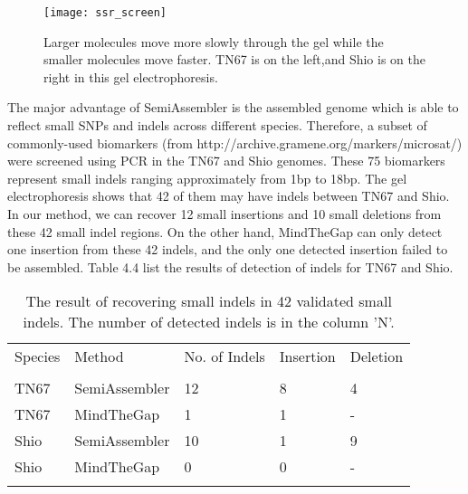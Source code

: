 \begin{figure}[ht]
\begin{center}
\texttt{[image: ssr\_screen]}
\caption{Larger molecules move more slowly through the gel while the smaller molecules move faster. TN67 is on the left,and Shio is on the right in this gel electrophoresis.}
\label{}
\end{center}
\end{figure}

The major advantage of SemiAssembler is the assembled genome which is able to reflect small SNPs and indels across different species. Therefore, a subset of commonly-used biomarkers (from http://archive.gramen\-e.org/markers/microsat/) were screened using PCR in the TN67 and Shio genomes. 
These 75 biomarkers represent small indels ranging approximately from 1bp to 18bp. The gel electrophoresis shows that 42 of them may have indels between TN67 and Shio. In our method, we can recover 12 small insertions and 10 small deletions from these 42 small indel regions. On the other hand, MindTheGap can only detect one insertion from these 42 indels, and the only one detected insertion failed to be assembled. Table 4.4 list the results of detection of indels for TN67 and Shio.

\hfill
\begin{table}[!ht]
    \centering
    \begin{tabular}[t]{l|llll}
     Species & Method &  No. of Indels & Insertion & Deletion\\\\
      \hline
      
    TN67 & SemiAssembler & 12 & 8 & 4 \\
    TN67 & MindTheGap & 1 & 1 & - \\
    Shio & SemiAssembler & 10 & 1 & 9 \\
    Shio & MindTheGap & 0 & 0 & - \\\\
      
   \end{tabular}
    \caption{The result of recovering small indels in 42 validated small indels. The number of detected indels is in the column 'N'.}
    \label{}
\end{table}




